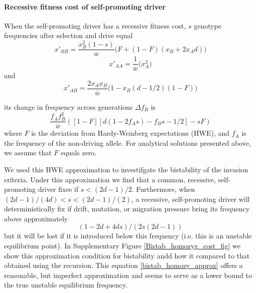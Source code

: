 \documentclass[12pt,letterpaper]{article}
\begin{document}
\paragraph{Recessive fitness cost of self-promoting driver}
When the self-promoting driver has a recessive fitness cost, $s$ genotype frequencies after selection and drive equal
\begin{equation}	x'_{BB} =\frac{x_{B}^2(1-s)}{\bar{w} }  \Big( F+(1-F)(x_{B}+2x_{A} d) \Big) 	\end{equation}
\begin{equation}	x'_{AA} =\frac{1}{\bar{w} }  \Big(x_{A}^2\Big) 	\end{equation}
and
\begin{equation}	x'_{AB} =\frac{2 x_{A}x_{B} }{\bar{w} }  \Big(1-x_{B}(d-1/2)(1-F) \Big)	\end{equation}

its change in frequency across generations $\Delta f_B$ is
\begin{equation}
\frac{f_A f_B^2}{\bar{w}} \left( [1-F][ d(1-2 f_A s) - f_B s-1/2] - s  F \right)
\label{deltadriver}
\end{equation}
where $F$ is the deviation from Hardy-Weinberg expectations (HWE), and $f_A$ is the frequency of the non-driving allele. 
For analytical solutions presented above, we assume that $F$ equals zero. 

We used this HWE approximation to investifgate the bistability of the
invasion criteria. Under this approximation we find that a common, recessive, self-promoting driver fixes if
 $s<(2d-1)/2$. Furthermore, when $(2 d - 1)/(4 d)<s<(2d-1)/(2)$, a
 recessive, self-promoting driver will deterministically fix if drift,
 mutation, or migration pressure bring its frequency above approximately
\begin{equation} 
(1-2d+4ds)/(2s(2d-1)) \label{bistab_homozy_approx}
\end{equation}
 but it will be lost if it is introduced below this frequency
 (i.e. this is an unstable equilibrium point). In Supplementary Figure \ref{Bistab_homozyg_cost_fig} we show
 this approximation condition for bistability andd how it compared to
 that obtained using the recursion. This equation
 \eqref{bistab_homozy_approx} offers a reasonable, but imperfect
 approximation 
and seems to serve as a lower bound to the
true unstable equilibrium frequency. 
\end{document}
